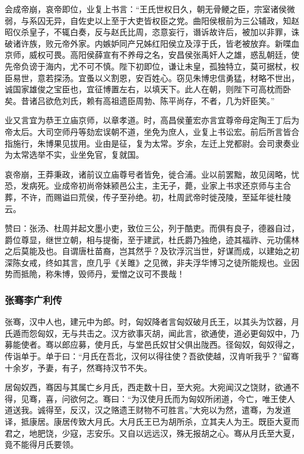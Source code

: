 \documentclass[]{article}
\begin{document}
会成帝崩，哀帝即位，业复上书言：``王氏世权日久，朝无骨鲠之臣，宗室诸侯微弱，与系囚无异，自佐史以上至于大吏皆权臣之党。曲阳侯根前为三公辅政，知赵昭仪杀皇子，不辄白奏，反与赵氏比周，恣意妄行，谮诉故许后，被加以非罪，诛破诸许族，败元帝外家。内嫉妒同产兄姊红阳侯立及淳于氏，皆老被放弃。新喋血京师，威权可畏。高阳侯薛宣有不养母之名，安昌侯张禹奸人之雄，惑乱朝廷，使先帝负谤于海内，尤不可不慎。陛下初即位，谦让未皇，孤独特立，莫可据杖，权臣易世，意若探汤。宜蚤以义割恩，安百姓心。窃见朱博忠信勇猛，材略不世出，诚国家雄俊之宝臣也，宜征博置左右，以填天下。此人在朝，则陛下可高枕而卧矣。昔诸吕欲危刘氏，赖有高祖遗臣周勃、陈平尚存，不者，几为奸臣笑。''

业又言宜为恭王立庙京师，以章孝道。时，高昌侯董宏亦言宜尊帝母定陶王丁后为帝太后。大司空师丹等劾宏误朝不道，坐免为庶人，业复上书讼宏。前后所言皆合指施行，朱博果见拔用。业由是征，复为太常。岁余，左迁上党都尉。会司隶奏业为太常选举不实，业坐免官，复就国。

哀帝崩，王莽秉政，诸前议立庙尊号者皆免，徙合浦。业以前罢黜，故见阔略，忧恐，发病死。业成帝初尚帝妹颍邑公主，主无子，薨，业家上书求还京师与主合葬，不许，而赐谥曰荒侯，传子至孙绝。初，杜周武帝时徙茂陵，至延年徙杜陵云。

赞曰：张汤、杜周并起文墨小吏，致位三公，列于酷吏。而俱有良子，德器自过，爵位尊显，继世立朝，相与提衡，至于建武，杜氏爵乃独绝，迹其福祚、元功儒林之后莫能及也。自谓唐杜苗裔，岂其然乎？及钦浮沉当世，好谋而成，以建始之初深陈女戒，终如其言，庶几乎《关雎》之见微，非夫浮华博习之徒所能规也。业因势而抵陒，称朱博，毁师丹，爱憎之议可不畏哉！

\hypertarget{header-n4723}{%
\subsubsection{张骞李广利传}\label{header-n4723}}

张骞，汉中人也，建元中为郎。时，匈奴降者言匈奴破月氏王，以其头为饮器，月氏遁而怨匈奴，无与共击之。汉方欲事灭胡，闻此言，欲通使，道必更匈奴中，乃募能使者。骞以郎应募，使月氏，与堂邑氏奴甘父俱出陇西。径匈奴，匈奴得之，传诣单于。单于曰：``月氏在吾北，汉何以得往使？吾欲使越，汉肯听我乎？''留骞十余岁，予妻，有子，然骞持汉节不失。

居匈奴西，骞因与其属亡乡月氏，西走数十日，至大宛。大宛闻汉之饶财，欲通不得，见骞，喜，问欲何之。骞曰：``为汉使月氏而为匈奴所闭道，今亡，唯王使人道送我。诚得至，反汉，汉之赂遗王财物不可胜言。''大宛以为然，遣骞，为发道译，抵康居。康居传致大月氏。大月氏王已为胡所杀，立其夫人为王。既臣大夏而君之，地肥饶，少寇，志安乐。又自以远远汉，殊无报胡之心。骞从月氏至大夏，竟不能得月氏要领。
\end{document}
